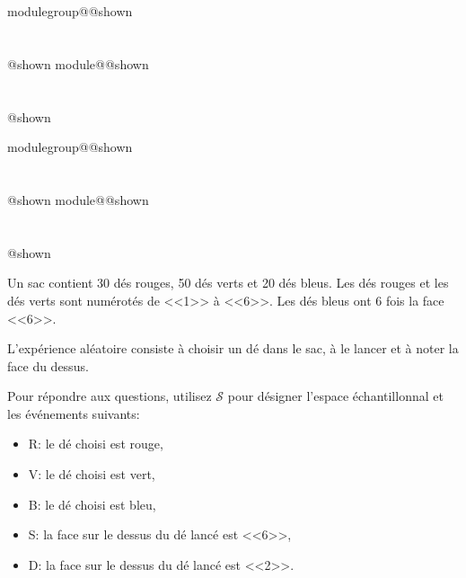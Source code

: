 \documentclass{Evaluation}
\makeatletter
\newcommand{\currentmodulekey}{}
\newcommand{\currentmoduletitle}{}
\newcommand{\currentgroupkey}{}
\newcommand{\currentgrouptitle}{}
\newcommand{\showmoduleifneeded}{%
  \ifx\currentgroupkey\empty\else
    \expandafter\ifx\csname modulegroup@\currentgroupkey @shown\endcsname\relax
      \section*{\currentgrouptitle}%
      \expandafter\gdef\csname modulegroup@\currentgroupkey @shown\endcsname{1}%
    \fi
  \fi
  \expandafter\ifx\csname module@\currentmodulekey @shown\endcsname\relax
    \section*{\currentmoduletitle}%
    \expandafter\gdef\csname module@\currentmodulekey @shown\endcsname{1}%
  \fi
}
\newenvironment{H26}{\showmoduleifneeded}{}
\newenvironment{H26r}{\showmoduleifneeded}{}
\makeatother
\begin{document}
\begin{questions}
\begin{H26}

\end{H26}

\begin{H26r}
\question {} %
Un sac contient 30 dés rouges, 50 dés verts et 20 dés bleus.
Les dés rouges et les dés verts sont numérotés de <<1>> à <<6>>.
Les dés bleus ont 6 fois la face <<6>>.

L'expérience aléatoire consiste à choisir un dé dans le sac, à le lancer et à noter la face du dessus.

Pour répondre aux questions, utilisez $\mathcal{S}$ pour désigner l'espace échantillonnal et les événements suivants:

\begin{itemize}
    \item R: le dé choisi est rouge,
    \item V: le dé choisi est vert,
    \item B: le dé choisi est bleu,
    \item S: la face sur le dessus du dé lancé est <<6>>,
    \item D: la face sur le dessus du dé lancé est <<2>>.
\end{itemize}


\end{H26r}
\end{questions}
\end{document}
